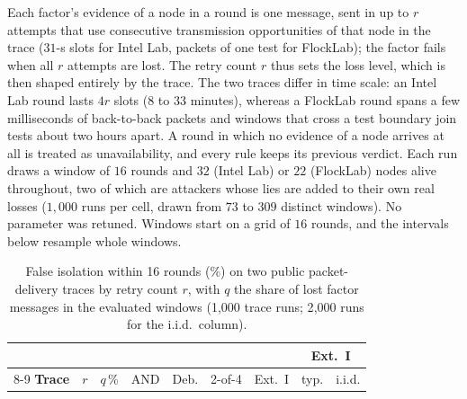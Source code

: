 Each factor's evidence of a node in a round is one message, sent in up
to $r$ attempts that use consecutive transmission opportunities of
that node in the trace ($31$-s slots for Intel Lab, packets of one
test for FlockLab); the factor fails when all $r$ attempts are lost.
The retry count $r$ thus sets the loss level, which is then shaped
entirely by the trace.  The two traces differ in time scale: an Intel
Lab round lasts $4r$ slots ($8$ to $33$ minutes), whereas a FlockLab
round spans a few milliseconds of back-to-back packets and windows that
cross a test boundary join tests about two hours apart.  A round in
which no evidence of a node arrives at all is treated as
unavailability, and every rule keeps its previous verdict.  Each run
draws a window of $16$ rounds and $32$ (Intel Lab) or $22$ (FlockLab)
nodes alive throughout, two of which are attackers whose lies are added
to their own real losses ($1{,}000$ runs per cell, drawn from $73$ to
$309$ distinct windows).  No parameter was retuned.  Windows start on a
grid of $16$ rounds, and the intervals below resample whole windows.

\begin{table}[!t]
\caption{False isolation within 16 rounds (\%) on two public packet-delivery traces by retry count $r$, with $q$ the share of lost factor messages in the evaluated windows (1{,}000 trace runs; 2{,}000 runs for the i.i.d.\ column).}
\label{tab:trace}
\centering
\renewcommand{\arraystretch}{1.08}
\footnotesize
\setlength{\tabcolsep}{2.4pt}
\begin{tabular}{lrrrrrrrr}
\toprule
 & & & & & & & \multicolumn{2}{c}{\textbf{Ext.~I}} \\
\cmidrule(lr){8-9}
\textbf{Trace} & $r$ & $q$\,\% & AND & Deb. & 2-of-4 & Ext.~I & typ. & i.i.d. \\
\midrule
\bottomrule
\end{tabular}
\end{table}

